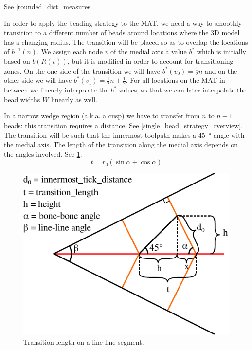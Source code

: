 See \cref{rounded_dist_measures}.

In order to apply the beading strategy to the MAT, we need a way to smoothly transition to a different number of beads around locations where the 3D model has a changing radius.
The transition will be placed so as to overlap the locations of $b^{-1}(n)$.
We assign each node $v$ of the medial axis a value $b^*$ which is initially based on $b(R(v))$, but it is modified in order to account for transitioning zones.
On the one side of the transition we will have $b^*(v_0)=\frac12 n$ and on the other side we will have $b^*(v_1)=\frac12 n + \frac12$.
For all locations on the MAT in between we linearly interpolate the $b^*$ values, so that we can later interpolate the bead widths $W$ linearly as well.

In a narrow wedge region (a.k.a. a cusp) we have to transfer from $n$ to $n-1$ beads; this transition requires a distance.
See \cref{single_bead_strategy_overview}.
The transition will be such that the innermost toolpath makes a \SI{45}{\degree} angle with the medial axis.
The length of the transition along the medial axis depends on the angles involved.
See \cref{transition_length}.
\begin{equation}
t = r_0 (\sin \alpha + \cos \alpha)
\end{equation}

\begin{figure}[H]
\centering
\includegraphics[width=.75\columnwidth]{sources/method/transition_length_v2.pdf}
\caption{Transition length on a line-line segment.}
\label{transition_length}
\end{figure}

